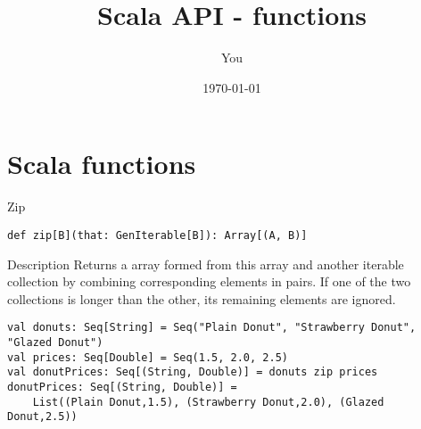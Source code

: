 \documentclass{beamer}
\title[Scala functions]{Scala API - functions}
\author{You}
\institute{Where You're From}
\date{\today}
\begin{document}
    \begin{frame}
        \titlepage
    \end{frame}

    \section{Scala functions}

    \begin{frame}[fragile]{Zip}
        \begin{lstlisting}[style=Signature]
def zip[B](that: GenIterable[B]): Array[(A, B)]
        \end{lstlisting}

        \begin{block}{Description}
            Returns a array formed from this array and another iterable collection by combining corresponding elements in pairs. If one of the two collections is longer than the other, its remaining elements are ignored.
        \end{block}
        \vskip 1cm

        \begin{lstlisting}[style=Default]
val donuts: Seq[String] = Seq("Plain Donut", "Strawberry Donut", "Glazed Donut")
val prices: Seq[Double] = Seq(1.5, 2.0, 2.5)
val donutPrices: Seq[(String, Double)] = donuts zip prices
donutPrices: Seq[(String, Double)] =
    List((Plain Donut,1.5), (Strawberry Donut,2.0), (Glazed Donut,2.5))
        \end{lstlisting}
        
        \begin{block}

        \end{block}
    \end{frame}
\end{document}
